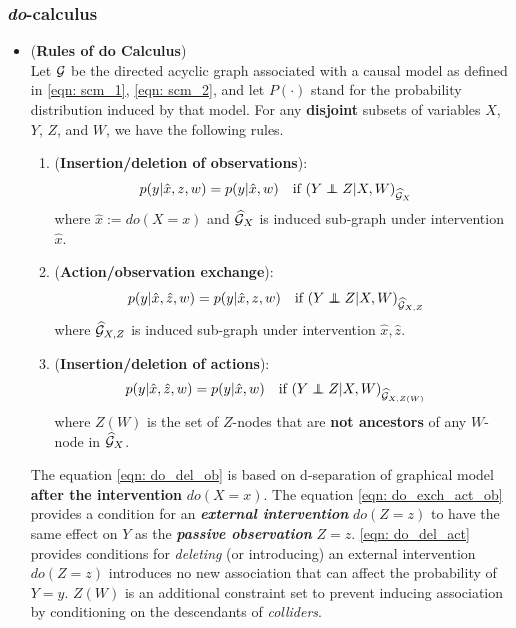 \documentclass[11pt]{article}
\begin{document}
\subsubsection{\emph{do}-calculus}
\begin{itemize}
\item 
\begin{proposition}(\textbf{Rules of do Calculus})\citep{pearl2000causal}  \\
Let ${\mathcal G}$ be the directed acyclic graph associated with a causal model as defined in \eqref{eqn: scm_1}, \eqref{eqn: scm_2}, and let $P(\cdot)$ stand for the probability distribution induced by that model. For any \textbf{disjoint} subsets of variables $X$, $Y$, $Z$, and $W$, we have the following rules.
\begin{enumerate}
\item (\textbf{Insertion/deletion of observations}):
\begin{align}
p(y| \hat{x}, z, w)&= p(y| \hat{x},  w) \quad \text{if }(Y \indep Z | X, W)_{\widehat{\cG}_{X}} \label{eqn: do_del_ob}
\end{align} where $\hat{x} := do(X=x)$ and $\widehat{{\mathcal G}}_{X}$ is induced sub-graph under intervention $\hat{x}$.

\item (\textbf{Action/observation exchange}):
\begin{align}
p(y| \hat{x}, \hat{z}, w)&= p(y| \hat{x}, z, w) \quad \text{if }(Y \indep Z | X, W)_{\widehat{\cG}_{X, Z}}  \label{eqn: do_exch_act_ob}
\end{align} where $\widehat{{\mathcal G}}_{X,Z}$ is induced sub-graph under intervention $\hat{x}, \hat{z}$.

\item  (\textbf{Insertion/deletion of actions}):
\begin{align}
p(y| \hat{x}, \hat{z}, w)&= p(y| \hat{x},  w) \quad \text{if }(Y \indep Z | X, W)_{\widehat{\cG}_{X, Z(W)}} \label{eqn: do_del_act}
\end{align} where $Z(W)$ is the set of $Z$-nodes that are \textbf{not ancestors} of any $W$-node in $\widehat{{\mathcal G}}_{X}$.
\end{enumerate}
\end{proposition}

The equation \eqref{eqn: do_del_ob} is based on d-separation of graphical model \textbf{after the intervention} $do(X=x)$. The equation \eqref{eqn: do_exch_act_ob} provides a condition for an \emph{\textbf{external intervention}} $do(Z=z)$ to have the same effect on $Y$ as the \emph{\textbf{passive observation}} $Z=z$. \eqref{eqn: do_del_act} provides conditions for \emph{deleting} (or introducing) an external intervention $do(Z=z)$ introduces no new association
that can affect the probability of $Y=y$. $Z(W)$ is an additional constraint set to prevent inducing association by conditioning on the descendants of \emph{colliders}.


\end{itemize}
\end{document}
